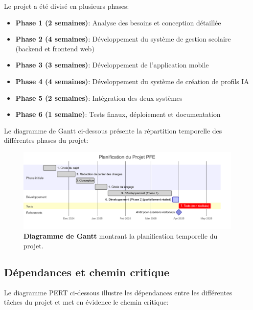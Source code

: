 Le projet a été divisé en plusieurs phases:

\begin{itemize}
  \item \textbf{Phase 1 (2 semaines)}: Analyse des besoins et conception détaillée
  
  \item \textbf{Phase 2 (4 semaines)}: Développement du système de gestion scolaire (backend et frontend web)
  
  \item \textbf{Phase 3 (3 semaines)}: Développement de l'application mobile
  
  \item \textbf{Phase 4 (4 semaines)}: Développement du système de création de profils IA
  
  \item \textbf{Phase 5 (2 semaines)}: Intégration des deux systèmes
  
  \item \textbf{Phase 6 (1 semaine)}: Tests finaux, déploiement et documentation
\end{itemize}

Le diagramme de Gantt ci-dessous présente la répartition temporelle des différentes phases du projet:

\begin{figure}[H]
  \centering
  \includegraphics[width=1.0\textwidth,keepaspectratio]{pfe-pics/diagrames/Mermaid Chart - Create complex, visual diagrams with text. A smarter way of creating diagrams.-2025-06-10-203842.png}
  \caption{\textbf{Diagramme de Gantt} montrant la planification temporelle du projet.}
  \label{fig:gantt_chart}
\end{figure}

\subsection{Dépendances et chemin critique}

Le diagramme PERT ci-dessous illustre les dépendances entre les différentes tâches du projet et met en évidence le chemin critique:


